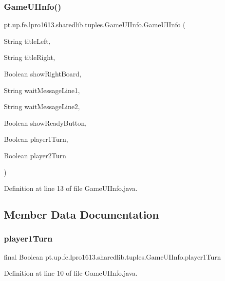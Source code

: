 \subsubsection{\texorpdfstring{Game\+U\+I\+Info()}{GameUIInfo()}}
{\footnotesize\ttfamily pt.\+up.\+fe.\+lpro1613.\+sharedlib.\+tuples.\+Game\+U\+I\+Info.\+Game\+U\+I\+Info (\begin{DoxyParamCaption}\item[{String}]{title\+Left,  }\item[{String}]{title\+Right,  }\item[{Boolean}]{show\+Right\+Board,  }\item[{String}]{wait\+Message\+Line1,  }\item[{String}]{wait\+Message\+Line2,  }\item[{Boolean}]{show\+Ready\+Button,  }\item[{Boolean}]{player1\+Turn,  }\item[{Boolean}]{player2\+Turn }\end{DoxyParamCaption})}



Definition at line 13 of file Game\+U\+I\+Info.\+java.



\subsection{Member Data Documentation}
\hypertarget{classpt_1_1up_1_1fe_1_1lpro1613_1_1sharedlib_1_1tuples_1_1_game_u_i_info_a0d33270d3239e508449e0804541611f8}{}\label{classpt_1_1up_1_1fe_1_1lpro1613_1_1sharedlib_1_1tuples_1_1_game_u_i_info_a0d33270d3239e508449e0804541611f8} 
\subsubsection{\texorpdfstring{player1\+Turn}{player1Turn}}
{\footnotesize\ttfamily final Boolean pt.\+up.\+fe.\+lpro1613.\+sharedlib.\+tuples.\+Game\+U\+I\+Info.\+player1\+Turn}



Definition at line 10 of file Game\+U\+I\+Info.\+java.

